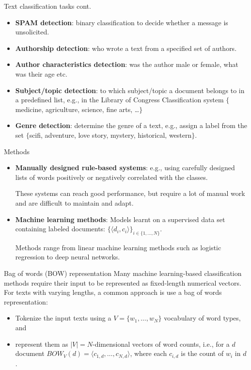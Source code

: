 \documentclass[style=upen, size=14pt]{powerdot}
\newcommand{\gold}{\color{arany}}
\theoremstyle{definition}
\begin{document}
\begin{slide}[toc=]{Text classification tasks cont.}
  \begin{itemize}
  \item \textbf{\gold SPAM detection}: binary classification to decide whether
    a message is unsolicited.
  \item \textbf{\gold Authorship detection}: who wrote a text from a specified set of authors.
  \item \textbf{\gold Author characteristics detection}: was the author male or
    female, what was their age etc.
  \item \textbf{\gold Subject/topic detection}: to which subject/topic a
    document belongs to in a predefined list, e.g., in the Library of Congress Classification system
    $\{$medicine, agriculture, science, fine arts, \dots $\}$
  \item \textbf{\gold Genre detection}: determine the genre of a text, e.g.,
    assign a label from the set $\{$scifi, adventure, love story, mystery,
    historical, western$\}$.
  \end{itemize}
 \end{slide}

 \begin{slide}[toc=Methods]{Methods}
   \begin{itemize}
   \item \textbf{\gold Manually designed rule-based systems}: e.g., using
     carefully designed lists of words positively or negatively correlated with
     the classes.
     
     These systems can reach good performance, but require a lot of manual work
     and are difficult to maintain and adapt.
   \item \textbf{\gold Machine learning methods}: Models learnt on a supervised
     data set containing labeled documents:
     $\{\langle d_i, c_i \rangle\}_{i\in \{1, \dots, N\}}$.

     Methods range from linear machine learning methods such as logistic
     regression to deep neural networks.
   \end{itemize}
 \end{slide}

 \begin{slide}[toc=Bag of words]{Bag of words (BOW) representation}
   Many machine learning-based classification methods require their input to be
   represented as fixed-length numerical  vectors. For texts with varying
   lengths, a common approach is use a bag of words representation:
   \begin{itemize}
   \item Tokenize the input texts using a $V=\{w_1,\dots,w_N\}$ vocabulary of
     word types, and
   \item represent them as $|V|=N$-dimensional vectors of word counts, i.e., for
     a $d$ document $BOW_V(d)=\langle c_{1,d}, \dots, c_{N,d}\rangle$, where each $c_{i,d}$
     is the count of $w_i$ in $d$.
   \end{itemize}
 \end{slide}
\end{document}
